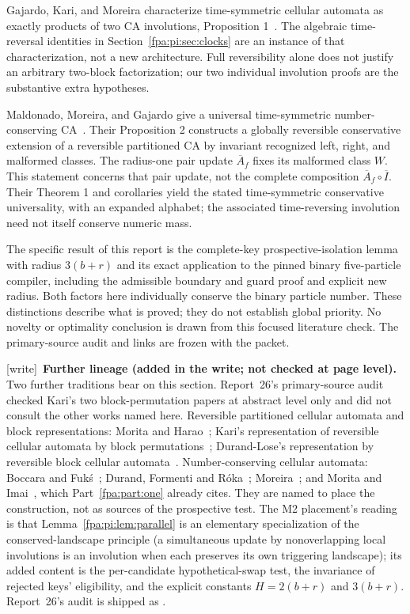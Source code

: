\documentclass[11pt,a4paper]{article}
\numberwithin{equation}{section}
\newcommand{\wtag}{\textup{[write]}}
\begin{document}
Gajardo, Kari, and Moreira characterize time-symmetric cellular automata as exactly products of two CA involutions, Proposition 1~\cite{fpa:gkm}. The algebraic time-reversal identities in Section~\ref{fpa:pi:sec:clocks} are an instance of that characterization, not a new architecture. Full reversibility alone does not justify an arbitrary two-block factorization; our two individual involution proofs are the substantive extra hypotheses.

Maldonado, Moreira, and Gajardo give a universal time-symmetric number-conserving CA~\cite{fpa:mmg}. Their Proposition 2 constructs a globally reversible conservative extension of a reversible partitioned CA by invariant recognized left, right, and malformed classes. The radius-one pair update $\overline A_f$ fixes its malformed class $W$. This statement concerns that pair update, not the complete composition $\overline A_f\circ\overline I$. Their Theorem 1 and corollaries yield the stated time-symmetric conservative universality, with an expanded alphabet; the associated time-reversing involution need not itself conserve numeric mass.

The specific result of this report is the complete-key prospective-isolation lemma with radius $3(b+r)$ and its exact application to the pinned binary five-particle compiler, including the admissible boundary and guard proof and explicit new radius. Both factors here individually conserve the binary particle number. These distinctions describe what is proved; they do not establish global priority. No novelty or optimality conclusion is drawn from this focused literature check. The primary-source audit and links are frozen with the packet.

\wtag\ \textbf{Further lineage (added in the write; not checked at page level).} Two further traditions bear on this section. Report~26's primary-source audit checked Kari's two block-permutation papers at abstract level only and did not consult the other works named here. Reversible partitioned cellular automata and block representations: Morita and Harao~\cite{fpa:moritaharao}; Kari's representation of reversible cellular automata by block permutations~\cite{fpa:kari96,fpa:kari99}; Durand-Lose's representation by reversible block cellular automata~\cite{fpa:durandlose}. Number-conserving cellular automata: Boccara and Fuk\'s~\cite{fpa:boccarafuks}; Durand, Formenti and R\'oka~\cite{fpa:dfr}; Moreira~\cite{fpa:moreira03}; and Morita and Imai~\cite{fpa:moritaimai2001}, which Part~\ref{fpa:part:one} already cites. They are named to place the construction, not as sources of the prospective test. The M2 placement's reading is that Lemma~\ref{fpa:pi:lem:parallel} is an elementary specialization of the conserved-landscape principle (a simultaneous update by nonoverlapping local involutions is an involution when each preserves its own triggering landscape); its added content is the per-candidate hypothetical-swap test, the invariance of rejected keys' eligibility, and the explicit constants $H=2(b+r)$ and $3(b+r)$. Report~26's audit is shipped as .
\end{document}
